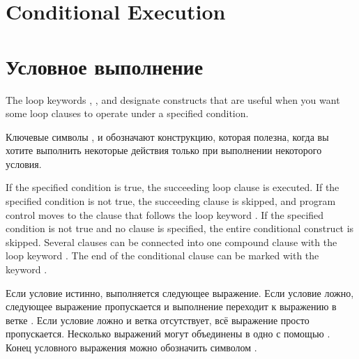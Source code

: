 \section{Conditional Execution}
\label{LOOP-COND-SECTION}

\section{Условное выполнение}
\label{LOOP-COND-SECTION}

The loop keywords , , and  designate constructs that 
are useful when you want some loop clauses to operate under a specified
condition.

Ключевые символы ,  и  обозначают
конструкцию, которая полезна, когда вы хотите выполнить некоторые
действия только при выполнении некоторого условия.

If the specified condition is true, the succeeding loop clause
is executed.  If the specified condition is not true, the succeeding clause is
skipped, and program control moves to the clause that follows the loop
keyword .  If the specified condition is not true and no
 clause is specified, the entire conditional construct
is skipped.  Several clauses can be connected into
one compound clause with the loop keyword .
The end of the conditional clause can be marked with the keyword .

Если условие истинно, выполняется следующее выражение. Если условие
ложно, следующее выражение пропускается и выполнение переходит к
выражению в ветке . Если условие ложно и ветка 
отсутствует, всё выражение просто пропускается. Несколько выражений
могут объединены в одно с помощью . Конец условного выражения
можно обозначить символом .

